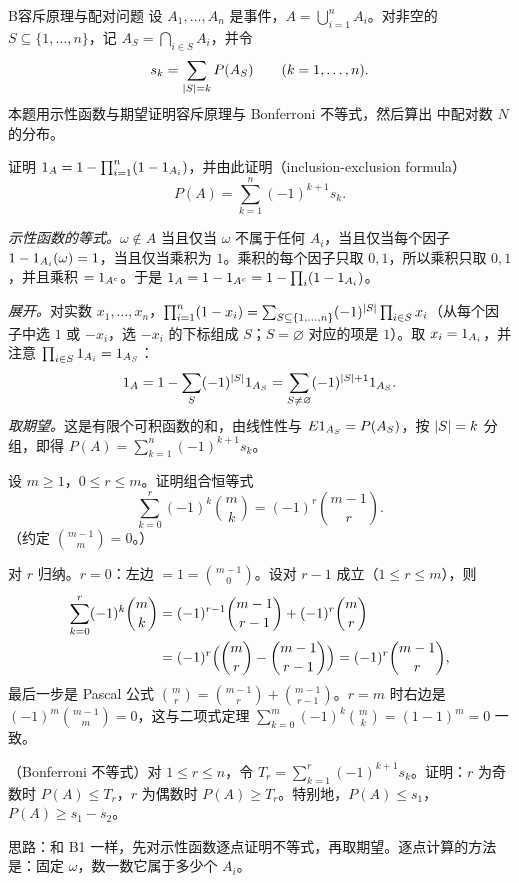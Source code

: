 \begin{probleme}{B}{容斥原理与配对问题}
设 $A_1,\dots,A_n$ 是事件，$A=\bigcup_{i=1}^nA_i$。对非空的 $S\subseteq\{1,\dots,n\}$，记 $A_S=\bigcap_{i\in S}A_i$，并令
\[
s_k=\sum_{\lvert S\rvert=k}P(A_S)\qquad(k=1,\dots,n).
\]
本题用示性函数与期望证明容斥原理与 Bonferroni 不等式，然后算出 中配对数 $N$ 的分布。
\begin{questions}
\item 证明 $1_A=1-\prod_{i=1}^n(1-1_{A_i})$，并由此证明（inclusion-exclusion formula）
\[
P(A)=\sum_{k=1}^n(-1)^{k+1}s_k .
\]
\begin{solution}
\emph{示性函数的等式。}$\omega\notin A$ 当且仅当 $\omega$ 不属于任何 $A_i$，当且仅当每个因子 $1-1_{A_i}(\omega)=1$，当且仅当乘积为 $1$。乘积的每个因子只取 $0,1$，所以乘积只取 $0,1$，并且乘积 $=1_{A^c}$。于是 $1_A=1-1_{A^c}=1-\prod_i(1-1_{A_i})$。

\emph{展开。}对实数 $x_1,\dots,x_n$，$\prod_{i=1}^n(1-x_i)=\sum_{S\subseteq\{1,\dots,n\}}(-1)^{\lvert S\rvert}\prod_{i\in S}x_i$（从每个因子中选 $1$ 或 $-x_i$，选 $-x_i$ 的下标组成 $S$；$S=\varnothing$ 对应的项是 $1$）。取 $x_i=1_{A_i}$，并注意 $\prod_{i\in S}1_{A_i}=1_{A_S}$：
\[
1_A=1-\sum_S(-1)^{\lvert S\rvert}1_{A_S}=\sum_{S\neq\varnothing}(-1)^{\lvert S\rvert+1}1_{A_S}.
\]
\emph{取期望。}这是有限个可积函数的和，由线性性与 $E1_{A_S}=P(A_S)$，按 $\lvert S\rvert=k$ 分组，即得 $P(A)=\sum_{k=1}^n(-1)^{k+1}s_k$。
\end{solution}

\item 设 $m\geqslant1$，$0\leqslant r\leqslant m$。证明组合恒等式
\[
\sum_{k=0}^r(-1)^k\binom mk=(-1)^r\binom{m-1}r .
\]
（约定 $\binom{m-1}{m}=0$。）
\begin{solution}
对 $r$ 归纳。$r=0$：左边 $=1=\binom{m-1}0$。设对 $r-1$ 成立（$1\leqslant r\leqslant m$），则
\[
\begin{aligned}
\sum_{k=0}^r(-1)^k\binom mk&=(-1)^{r-1}\binom{m-1}{r-1}+(-1)^r\binom mr\\
&=(-1)^r\Bigl(\binom mr-\binom{m-1}{r-1}\Bigr)=(-1)^r\binom{m-1}r,
\end{aligned}
\]
最后一步是 Pascal 公式 $\binom mr=\binom{m-1}r+\binom{m-1}{r-1}$。$r=m$ 时右边是 $(-1)^m\binom{m-1}m=0$，这与二项式定理 $\sum_{k=0}^m(-1)^k\binom mk=(1-1)^m=0$ 一致。
\end{solution}

\item （Bonferroni 不等式）对 $1\leqslant r\leqslant n$，令 $T_r=\sum_{k=1}^r(-1)^{k+1}s_k$。证明：$r$ 为奇数时 $P(A)\leqslant T_r$，$r$ 为偶数时 $P(A)\geqslant T_r$。特别地，$P(A)\leqslant s_1$，$P(A)\geqslant s_1-s_2$。
\begin{solution}
思路：和 B1 一样，先对示性函数逐点证明不等式，再取期望。逐点计算的方法是：固定 $\omega$，数一数它属于多少个 $A_i$。


\end{solution}
\end{questions}
\end{probleme}
